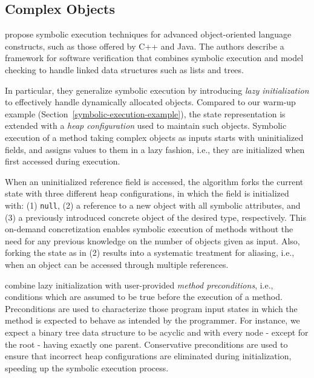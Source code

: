 \subsection{Complex Objects}
\label{ss:complex-objects}

\cite{KPV-TACAS03} propose symbolic execution techniques for advanced object-oriented language constructs, such as those offered by C++ and Java. The authors describe a framework for software verification that combines symbolic execution and model checking to handle linked data structures such as lists and trees. %

In particular, they generalize symbolic execution by introducing {\em lazy initialization} to effectively handle dynamically allocated objects. Compared to our warm-up example (Section~\ref{symbolic-execution-example}), the state representation is extended with a {\em heap configuration} used to maintain such objects. Symbolic execution of a method taking complex objects as inputs starts with uninitialized fields, and assigns values to them in a lazy fashion, i.e., they are initialized when first accessed during execution.

When an uninitialized reference field is accessed, the algorithm forks the current state with three different heap configurations, in which the field is initialized with: (1) {\tt null}, (2) a reference to a new object with all symbolic attributes, and (3) a previously introduced concrete object of the desired type, respectively. This on-demand concretization enables symbolic execution of methods without the need for any previous knowledge on the number of objects given as input. Also, forking the state as in (2) results into a systematic treatment for aliasing, i.e., when an object can be accessed through multiple references.

\cite{KPV-TACAS03,SPF-ISSTA04} combine lazy initialization with user-provided  {\em method preconditions}, i.e., conditions which are assumed to be true before the execution of a method. Preconditions are used to characterize those program input states in which the method is expected to behave as intended by the programmer. For instance, we expect a binary tree data structure to be acyclic and with every node - except for the root - having exactly one parent. Conservative preconditions are used to ensure that incorrect heap configurations are eliminated during initialization, speeding up the symbolic execution process. 


